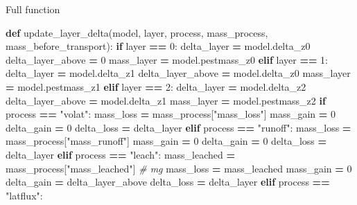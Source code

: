\documentclass[]{article}
\newenvironment{Shaded}{\begin{snugshade}}{\end{snugshade}}
\newcommand{\KeywordTok}[1]{\textcolor[rgb]{0.13,0.29,0.53}{\textbf{#1}}}
\newcommand{\DecValTok}[1]{\textcolor[rgb]{0.00,0.00,0.81}{#1}}
\newcommand{\StringTok}[1]{\textcolor[rgb]{0.31,0.60,0.02}{#1}}
\newcommand{\CommentTok}[1]{\textcolor[rgb]{0.56,0.35,0.01}{\textit{#1}}}
\newcommand{\ControlFlowTok}[1]{\textcolor[rgb]{0.13,0.29,0.53}{\textbf{#1}}}
\newcommand{\OperatorTok}[1]{\textcolor[rgb]{0.81,0.36,0.00}{\textbf{#1}}}
\newcommand{\NormalTok}[1]{#1}
\begin{document}
Full function

\begin{Shaded}
\begin{Highlighting}[]
\KeywordTok{def}\NormalTok{ update_layer_delta(model, layer, process, mass_process, mass_before_transport):}
    \ControlFlowTok{if}\NormalTok{ layer }\OperatorTok{==} \DecValTok{0}\NormalTok{:}
\NormalTok{      delta_layer }\OperatorTok{=}\NormalTok{ model.delta_z0}
\NormalTok{      delta_layer_above }\OperatorTok{=} \DecValTok{0}
\NormalTok{      mass_layer }\OperatorTok{=}\NormalTok{ model.pestmass_z0}
    \ControlFlowTok{elif}\NormalTok{ layer }\OperatorTok{==} \DecValTok{1}\NormalTok{:}
\NormalTok{        delta_layer }\OperatorTok{=}\NormalTok{ model.delta_z1}
\NormalTok{        delta_layer_above }\OperatorTok{=}\NormalTok{ model.delta_z0}
\NormalTok{        mass_layer }\OperatorTok{=}\NormalTok{ model.pestmass_z1}
    \ControlFlowTok{elif}\NormalTok{ layer }\OperatorTok{==} \DecValTok{2}\NormalTok{:}
\NormalTok{        delta_layer }\OperatorTok{=}\NormalTok{ model.delta_z2}
\NormalTok{        delta_layer_above }\OperatorTok{=}\NormalTok{ model.delta_z1}
\NormalTok{        mass_layer }\OperatorTok{=}\NormalTok{ model.pestmass_z2}
    \ControlFlowTok{if}\NormalTok{ process }\OperatorTok{==} \StringTok{"volat"}\NormalTok{:}
\NormalTok{        mass_loss }\OperatorTok{=}\NormalTok{ mass_process[}\StringTok{"mass_loss"}\NormalTok{]}
\NormalTok{        mass_gain }\OperatorTok{=} \DecValTok{0}
\NormalTok{        delta_gain }\OperatorTok{=} \DecValTok{0}
\NormalTok{        delta_loss }\OperatorTok{=}\NormalTok{ delta_layer}
    \ControlFlowTok{elif}\NormalTok{ process }\OperatorTok{==} \StringTok{"runoff"}\NormalTok{:}
\NormalTok{        mass_loss }\OperatorTok{=}\NormalTok{ mass_process[}\StringTok{"mass_runoff"}\NormalTok{]}
\NormalTok{        mass_gain }\OperatorTok{=} \DecValTok{0}
\NormalTok{        delta_gain }\OperatorTok{=} \DecValTok{0}
\NormalTok{        delta_loss }\OperatorTok{=}\NormalTok{ delta_layer}
    \ControlFlowTok{elif}\NormalTok{ process }\OperatorTok{==} \StringTok{"leach"}\NormalTok{:}
\NormalTok{        mass_leached }\OperatorTok{=}\NormalTok{ mass_process[}\StringTok{"mass_leached"}\NormalTok{]  }\CommentTok{# mg}
\NormalTok{        mass_loss }\OperatorTok{=}\NormalTok{ mass_leached}
\NormalTok{        mass_gain }\OperatorTok{=} \DecValTok{0}
\NormalTok{        delta_gain }\OperatorTok{=}\NormalTok{ delta_layer_above}
\NormalTok{        delta_loss }\OperatorTok{=}\NormalTok{ delta_layer}
    \ControlFlowTok{elif}\NormalTok{ process }\OperatorTok{==} \StringTok{"latflux"}\NormalTok{:}

\end{Highlighting}
\end{Shaded}
\end{document}
